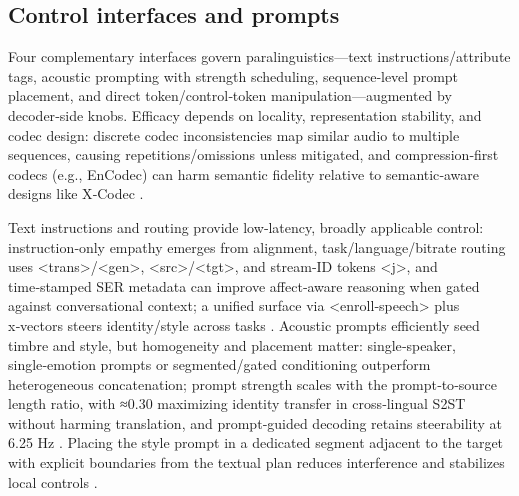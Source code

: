 \subsection{Control interfaces and prompts} \label{subsec:Control interfaces and prompts}
Four complementary interfaces govern paralinguistics—text instructions/attribute tags, acoustic prompting with strength scheduling, sequence‑level prompt placement, and direct token/control‑token manipulation—augmented by decoder‑side knobs. Efficacy depends on locality, representation stability, and codec design: discrete codec inconsistencies map similar audio to multiple sequences, causing repetitions/omissions unless mitigated, and compression‑first codecs (e.g., EnCodec) can harm semantic fidelity relative to semantic‑aware designs like X‑Codec \cite{liu2024analyzingmitigatinginconsistencydiscrete,ye2024codecdoesmatterexploringsemanticshortcom,fily2024establishingdegreesclosenessbetweenaudio}.

Text instructions and routing provide low‑latency, broadly applicable control: instruction‑only empathy emerges from alignment, task/language/bitrate routing uses <trans>/<gen>, <src>/<tgt>, and stream‑ID tokens <j>, and time‑stamped SER metadata can improve affect‑aware reasoning when gated against conversational context; a unified surface via <enroll‑speech> plus x‑vectors steers identity/style across tasks \cite{wang2024blspemotowardsempatheticlargespeechlangu,peng2024mslms2stmultitaskspeechlanguagemodeltext,wang2025incorporatingcontextualparalinguisticund,wu2024speechcomposerunifyingmultiplespeechtask}. Acoustic prompts efficiently seed timbre and style, but homogeneity and placement matter: single‑speaker, single‑emotion prompts or segmented/gated conditioning outperform heterogeneous concatenation; prompt strength scales with the prompt‑to‑source length ratio, with ≈0.30 maximizing identity transfer in cross‑lingual S2ST without harming translation, and prompt‑guided decoding retains steerability at 6.25 Hz \cite{peng2024empiricalstudyspeechlanguagemodelsprompt,gong2024seamlessexpressivelmspeechlanguagemodele,wang2025tadicodectextawarediffusionspeechtokeniz}. Placing the style prompt in a dedicated segment adjacent to the target with explicit boundaries from the textual plan reduces interference and stabilizes local controls \cite{wu2024speechcomposerunifyingmultiplespeechtask}.

